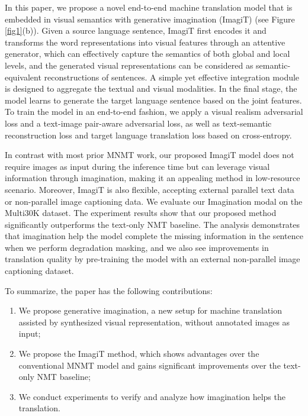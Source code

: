 \documentclass[11pt]{article}
\newcommand{\method}{ImagiT\xspace}
\begin{document}
In this paper, we propose a novel end-to-end machine translation model that is embedded in visual semantics with generative imagination (\method) (see Figure \ref{fig1}(b)). Given a source language sentence, \method first encodes it and transforms the word representations into visual features through an attentive generator, which can effectively capture the semantics of both global and local levels, and the generated visual representations can be considered as semantic-equivalent reconstructions of sentences. A simple yet effective integration module is designed to aggregate the textual and visual modalities. In the final stage, the model learns to generate the target language sentence based on the joint features. To train the model in an end-to-end fashion, we apply a visual realism adversarial loss and a text-image pair-aware adversarial loss, as well as text-semantic reconstruction loss and target language translation loss based on cross-entropy. 



In contrast with most prior MNMT work, our proposed \method model does not require images as input during the inference time but can leverage visual information through imagination, making it an appealing method in low-resource scenario. Moreover, \method is also flexible, accepting external parallel text data or non-parallel image captioning data. We evaluate our Imagination modal on the Multi30K dataset. The experiment results show that our proposed method significantly outperforms the text-only NMT baseline. The analysis demonstrates that imagination help the model complete the missing information in the sentence when we perform degradation masking, and we also see improvements in translation quality by pre-training the model with an external non-parallel image captioning dataset.

To summarize, the paper has the following contributions: 
\begin{enumerate}
    \item We propose generative imagination, a new setup for machine translation assisted by synthesized visual representation, without annotated images as input;
    \item We propose the \method method, which shows advantages over the conventional MNMT model and gains significant improvements over the text-only NMT baseline;
    \item We conduct experiments to verify and analyze how imagination helps the translation.
\end{enumerate} 
\end{document}
